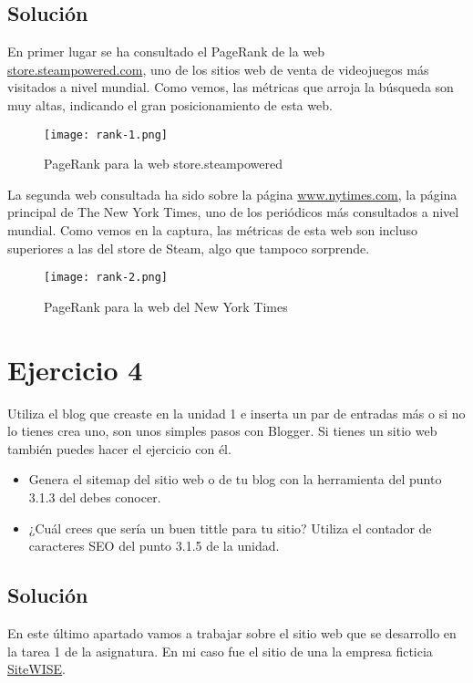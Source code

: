\subsection{Solución}
En primer lugar se ha consultado el PageRank de la web \url{store.steampowered.com}, uno de los sitios web de venta de
videojuegos más visitados a nivel mundial. Como vemos, las métricas que arroja la búsqueda son muy altas, indicando el
gran posicionamiento de esta web.

\begin{figure}[H]
    \centering
    \texttt{[image: rank-1.png]}
    \caption{PageRank para la web store.steampowered}
\end{figure}

La segunda web consultada ha sido sobre la página \url{www.nytimes.com}, la página principal de The New York Times, uno de los periódicos más consultados a nivel mundial. Como vemos en la captura, las métricas de esta web son incluso superiores a las del store de Steam, algo que tampoco sorprende.

\begin{figure}[H]
    \centering
    \texttt{[image: rank-2.png]}
    \caption{PageRank para la web del New York Times}
\end{figure}

\section{Ejercicio 4}
Utiliza el blog que creaste en la unidad 1 e inserta  un par de entradas más o si no lo tienes crea uno,  son unos simples pasos con Blogger. Si tienes un sitio web también puedes hacer el ejercicio con él.

\begin{itemize}
    \item Genera el sitemap del sitio web o de tu blog con la herramienta del punto 3.1.3 del debes conocer.
    \item ¿Cuál crees que sería un buen tittle para tu sitio? Utiliza el contador de caracteres SEO del punto 3.1.5 de la unidad.
\end{itemize}

\subsection{Solución}
En este último apartado vamos a trabajar sobre el sitio web que se desarrollo en la tarea 1 de la asignatura. En mi caso fue el sitio de una la empresa ficticia \href{https://sites.google.com/view/sitewise/inicio}{SiteWISE}.

